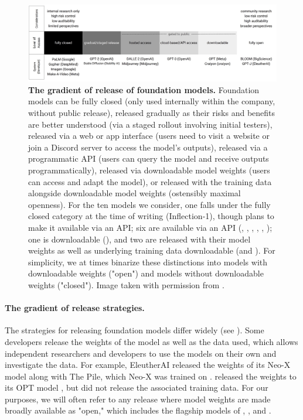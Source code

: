 \begin{figure}[t]
\centering
\includegraphics[width=\textwidth]{figures/gradient.jpg}
\caption{\textbf{The gradient of release of foundation models.} 
Foundation models can be fully closed (\eg only used internally within the company, without public release), 
released gradually as their risks and benefits are better understood (\eg via a staged rollout involving initial testers), 
released via a web or app interface (\eg users need to visit a website or join a Discord server to access the model's outputs), 
released via a programmatic API (\eg users can query the model and receive outputs programmatically), 
released via downloadable model weights (\eg users can access and adapt the model), 
or released with the training data alongside downloadable model weights (\ie ostensibly maximal openness). 
For the ten models we consider, one falls under the fully closed category at the time of writing (Inflection-1), though \inflection plans to make it available via an API; six are available via an API (\gptfour, \claude, \palm, \jurassic, \command, \titan); one is downloadable (\llama), and two are released with their model weights as well as underlying training data downloadable (\stablediffusion and \bloomz). 
For simplicity, we at times binarize these distinctions into models with downloadable weights ("open") and models without downloadable weights ("closed").
Image taken with permission from \citet{solaiman2023gradient}.}
\label{fig:release-gradient}
\end{figure}

\paragraph{The gradient of release strategies.}
The strategies for releasing foundation models differ widely (see ). Some developers release the weights of the model as well as the data used, which allows independent researchers and developers to use the models on their own and investigate the data. For example, EleutherAI released the weights of its Neo-X model \citep{black2022neox} along with The Pile, which Neo-X was trained on \citep{gao2021thepile}.
\meta released the weights to its OPT model \citep{zhang2022opt}, but did not release the associated training data.
For our purposes, we will often refer to any release where model weights are made broadly available as "open," which includes the flagship models of \huggingface, \meta, and \stability.

